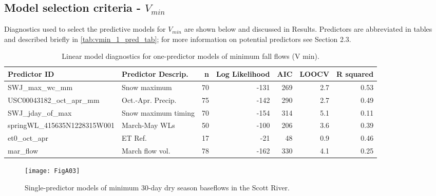 \documentclass[hess, manuscript]{copernicus}
\begin{document}
\newpage

\subsection{\texorpdfstring{Model selection criteria -
$V_{min}$}{Model selection criteria - V\_\{min\}}}

Diagnostics used to select the predictive models for $V_{min}$ are
shown below and discussed in Results. Predictors are abbreviated in
tables and described briefly in \autoref{tab:vmin_1_pred_tab}; for more
information on potential predictors see Section 2.3.

\begin{table}[ht]
\centering
\caption{Linear model diagnostics for one-predictor models of minimum fall flows (V min).} 
\label{tab:vmin_1_pred_tab}
\begin{tabular}{llrrrrr}
  \hline
Predictor ID & Predictor Descrip. & n & Log Likelihood & AIC & LOOCV & R squared \\ 
  \hline
SWJ\_max\_wc\_mm & Snow maximum & 70 & -131 & 269 & 2.7 & 0.53 \\ 
  USC00043182\_oct\_apr\_mm & Oct.-Apr. Precip. & 75 & -142 & 290 & 2.7 & 0.49 \\ 
  SWJ\_jday\_of\_max & Snow maximum timing & 70 & -154 & 314 & 5.1 & 0.11 \\ 
  springWL\_415635N1228315W001 & March-May WLs & 50 & -100 & 206 & 3.6 & 0.39 \\ 
  et0\_oct\_apr & ET Ref. & 17 & -21 & 48 & 0.9 & 0.46 \\ 
  mar\_flow & March flow vol. & 78 & -162 & 330 & 4.1 & 0.25 \\ 
   \hline
\end{tabular}
\end{table}

\begin{figure}
\texttt{[image: FigA03]} \caption{\label{fig:one_predictor_model} Single-predictor models of minimum 30-day dry season baseflows in the Scott River.}\label{fig:one_predictor_model}
\end{figure}
\end{document}
